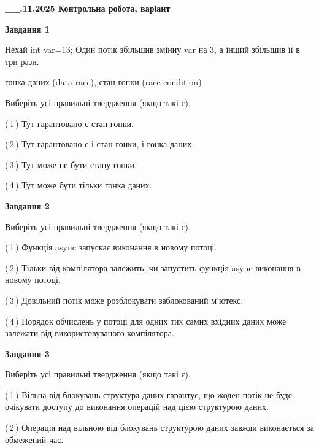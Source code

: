 \documentclass[12pt, ukrainian]{article}
\begin{document}
\begin {large}

\textbf{\_\_.11.2025 Контрольна робота, варіант  }\par


{

\begin{center}
\textbf{Завдання 1}
\end{center}
Нехай int var=13; Один потік збільшив змінну var на 3, а інший збільшив її в три рази.

гонка даних (data race), стан гонки (race condition)

Виберіть усі правильні твердження (якщо такі є).\par
\vspace{2mm}
(\,1\,) Тут гарантовано є стан гонки.%

(\,2\,) Тут гарантовано є і стан гонки, і гонка даних.%

(\,3\,) Тут може не бути стану гонки.%

(\,4\,) Тут може бути тільки гонка даних.%



\begin{center}
\textbf{Завдання 2}
\end{center}
Виберіть усі правильні твердження (якщо такі є).\par
\vspace{2mm}

(\,1\,) Функція async запускає виконання в новому потоці.%

(\,2\,) Тільки від компілятора залежить, чи запустить функція async виконання в новому потоці.%

(\,3\,) Довільний потік може розблокувати заблокований м’ютекс.%

(\,4\,) Порядок обчислень у потоці для одних тих самих вхідних даних може залежати від використовуваного компілятора.%



\begin{center}
\textbf{Завдання 3}
\end{center}
Виберіть усі правильні твердження (якщо такі є).\par
\vspace{2mm}

(\,1\,) Вільна від блокувань структура даних гарантує, що жоден потік не буде очікувати доступу до виконання операцій над цією структурою даних.%

(\,2\,) Операція над вільною від блокувань структурою даних завжди виконається за обмежений час.%

}
\end{large}
\end{document}
